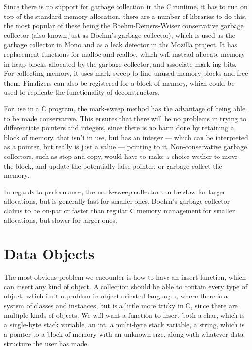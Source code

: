 \documentclass[table]{ituthesis}
\begin{document}
Since there is no support for garbage collection in the C runtime, it has to run on top of the standard memory allocation. there are a number of libraries to do this, the most popular of these being the Boehm-Demers-Weiser conservative garbage collector (also known just as Boehm's garbage collector), which is used as the garbage collector in Mono and as a leak detector in the Mozilla project. It has replacement functions for malloc and realloc, which will instead allocate memory in heap blocks allocated by the garbage collector, and associate mark-ing bits. For collecting memory, it uses mark-sweep to find unused memory blocks and free them. Finalizers can also be registered for a block of memory, which could be used to replicate the functionality of deconstructors.

For use in a C program, the mark-sweep method has the advantage of being able to be made conservative. This ensures that there will be no problems in trying to differentiate pointers and integers, since there is no harm done by retaining a block of memory, that isn't in use, but has an integer — which can be interpreted as a pointer, but really is just a value — pointing to it. Non-conservative garbage collectors, such as stop-and-copy, would have to make a choice wether to move the block, and update the potentially false pointer, or garbage collect the memory.

In regards to performance, the mark-sweep collector can be slow for larger allocations, but is generally fast for smaller ones. Boehm's garbage collector claims to be on-par or faster than regular C memory management for smaller allocations, but slower for larger ones.

\section{Data Objects}\label{sec:arch_data_objects}

The most obvious problem we encounter is how to have an insert function, which can insert any kind of object. A collection should be able to contain every type of object, which isn't a problem in object oriented languages, where there is a system of classes and instances, but is a little more tricky in C, since there are multiple kinds of objects. We will want a function to insert both a char, which is a single-byte stack variable, an int, a multi-byte stack variable, a string, which is a pointer to a block of memory with an unknown size, along with whatever data structure the user has made.
\end{document}

